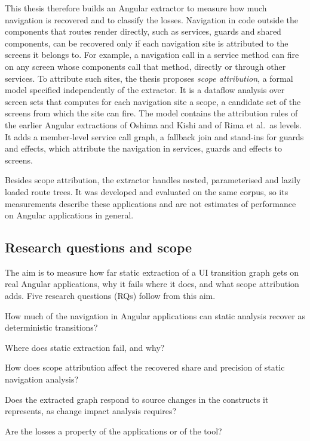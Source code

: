 This thesis therefore builds an Angular extractor to measure how much navigation is recovered and
to classify the losses. Navigation in code outside the components that routes render directly, such
as services, guards and shared components, can be recovered only if each navigation site is
attributed to the screens it belongs to. For example, a navigation call in a service method can fire on
any screen whose components call that method, directly or through other services. To attribute
such sites, the thesis proposes \emph{scope attribution}, a
formal model specified independently of the extractor. It is a dataflow analysis over screen sets
that computes for each navigation site a scope, a candidate set of the screens from which the site
can fire.
The model contains the attribution rules of the earlier Angular extractions of Oshima and Kishi and of Rima et al.\ as levels. It adds
a member-level service call graph, a fallback join and stand-ins for guards and effects, which
attribute the navigation in services, guards and effects to screens.

Besides scope attribution, the extractor handles nested, parameterised and lazily loaded route
trees. It was developed and evaluated on the same corpus, so its
measurements describe these applications and are not estimates of performance on Angular
applications in general.

\subsection{Research questions and scope}
\label{sec:rqs}

The aim is to measure how far static extraction of a UI transition graph gets on real Angular
applications, why it fails where it does, and what scope attribution adds. Five research questions
(RQs) follow from this aim.

\begin{description}[nosep,leftmargin=2.6em,labelwidth=2.2em]
\item[RQ1] How much of the navigation in Angular applications can static analysis recover as
  deterministic transitions?
\item[RQ2] Where does static extraction fail, and why?
\item[RQ3] How does scope attribution affect the recovered share and precision of static
  navigation analysis?
\item[RQ4] Does the extracted graph respond to source changes in the constructs it represents, as
  change impact analysis requires?
\item[RQ5] Are the losses a property of the applications or of the tool?
\end{description}

